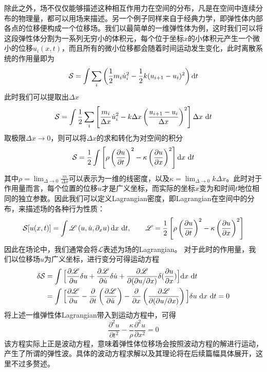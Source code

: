 \documentclass[b5paper]{book}
\begin{document}
除此之外，场不仅仅能够描述这种相互作用力在空间的分布，凡是在空间中连续分布的物理量，都可以用场来描述。另一个例子同样来自于经典力学，即弹性体内部各点的位移便构成一个位移场。我们以最简单的一维弹性体为例，这时我们可以将这段弹性体分割为一系列无穷小的体积元，每个位于坐标$x$的小体积元产生一个微小的位移$u_i(x,t)$，而且所有的微小位移都会随着时间运动发生变化，此时离散系统的作用量即为
\begin{equation}
    \mathcal{S} = \int\sum_i \left(\frac{1}{2}m_i \dot u_i^2 -\frac{1}{2}k (u_{i+1}-u_i)^2 \right) \mathrm{d}t
\end{equation}
此时我们可以提取出$\Delta x$
\begin{equation}
    \mathcal{S} = \int \frac{1}{2}\sum_i\left[\frac{m_i}{\Delta x} \dot u_i^2 -k\Delta x \left(\frac{u_{i+1}-u_i}{\Delta x}\right)^2 \right]\Delta x~ \mathrm{d}t
\end{equation}
取极限$ \Delta x\rightarrow 0$，则可以将$\Delta x$的求和转化为对空间的积分
\begin{equation}
    \mathcal{S} = \frac{1}{2}\int\left[\rho \left(\frac{\partial u}{\partial t}\right)^2 -\kappa\left(\frac{\partial u}{\partial x}\right)^2 \right] \mathrm{d} x~ \mathrm{d}t 
\end{equation}
其中$\rho = \lim_{\Delta\rightarrow0}\frac{m}{\Delta x}$可以表示为一维的线密度，以及$\kappa = \lim_{\Delta\rightarrow0}{k}{\Delta x}$。此时对于作用量而言，每个位置的位移$u$才是广义坐标，而实际的坐标$x$变为和时间$t$地位相同的独立参数。因此我们可以定义Lagrangian密度，即Lagrangian在空间中的分布，来描述场的各种行为性质：
\begin{equation}
    \mathcal{S}[u(x,t)] = \int \mathscr{L}\left(u,\dot u, {\partial_x u}\right) \mathrm{d}x ~\mathrm{d}t,\qquad \mathscr{L} = \frac{1}{2}\left[\rho \left(\frac{\partial u}{\partial t}\right)^2 -\kappa\left(\frac{\partial u}{\partial x}\right)^2 \right]
\end{equation}
因此在场论中，我们通常会将$\mathscr{L}$表述为场的Lagrangian。
对于此时的作用量，我们以位移场$u$为广义坐标，进行变分可得运动方程
\begin{equation}
\begin{split}
        \delta \mathcal{S} &= \int \Big[ \frac{\partial\mathscr{L}}{\partial u}\delta u + \frac{\partial \mathscr{L}}{\partial \dot u}\delta \dot u + \frac{\partial\mathscr{L}}{\partial (\partial u /\partial x)}\delta(\frac{\partial u}{\partial x}) \Big]  \mathrm{d}x ~\mathrm{d}t 
        \\&= \int \Big[ \frac{\partial\mathscr{L}}{\partial u} -\frac{\partial }{\partial t} \left(\frac{\partial \mathscr{L}}{\partial \dot u}\right)- \frac{\partial }{\partial x}\left( \frac{\partial\mathscr{L}}{\partial (\partial u /\partial x)} \right) \Big]\delta u  ~\mathrm{d}x ~\mathrm{d}t = 0
\end{split}
\end{equation}
将上述一维弹性体Lagrangian带入到运动方程中，可得
\begin{equation}
    \frac{\partial^2 u}{\partial t^2}-\frac{\kappa}{\rho} \frac{\partial^2 u}{\partial x^2} = 0
\end{equation}
该方程实际上正是波动方程，意味着弹性体位移场会按照波动方程的解进行运动，产生了所谓的弹性波。具体的波动方程求解以及其理论将在后续篇幅具体展开，这里不过多赘述。
\end{document}
